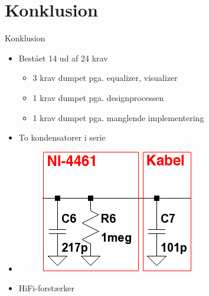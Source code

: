 \section{Konklusion}

\begin{frame}{Konklusion}

\begin{itemize}
\item<1-> Bestået 14 ud af 24 krav
\begin{itemize}
\item<1-> 3 krav dumpet pga. equalizer, visualizer
\item<1-> 1 krav dumpet pga. designprocessen
\item<1-> 1 krav dumpet pga. manglende implementering
\end{itemize}
\item<1-> To kondensatorer i serie
\item<2-> \begin{figure}[h]
\includegraphics[scale=0.6]{images/maalebelastning.png}
\end{figure}
\item<3-> \textcolor{light-gray}{HiFi-}forstærker
\end{itemize}

\end{frame}